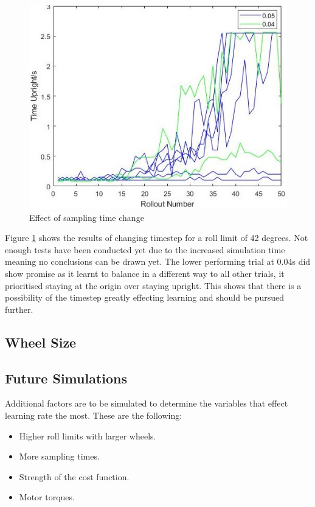 \documentclass[twoside,twocolumn,12pt]{article}
\begin{document}
\begin{figure}[h]
  \centering
    \includegraphics[width=\linewidth]{timestepeffect}
  \caption{Effect of sampling time change}
  \label{fig:st}
\end{figure}
Figure \ref{fig:st} shows the results of changing timestep for a roll limit of 42 degrees. Not enough tests have been conducted yet due to the increased simulation time meaning no conclusions can be drawn yet. The lower performing trial at 0.04s did show promise as it learnt to balance in a different way to all other trials, it prioritised staying at the origin over staying upright. This shows that there is a possibility of the timestep greatly effecting learning and should be pursued further.

\subsection{Wheel Size}

\subsection{Future Simulations}
Additional factors are to be simulated to determine the variables that effect learning rate the most. These are the following:

\begin{itemize}
\item Higher roll limits with larger wheels.
\item More sampling times.
\item Strength of the cost function.
\item Motor torques.
\end{itemize}
\end{document}
